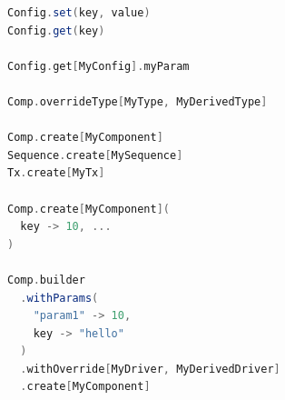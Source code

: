 \begin{listing}
\begin{lstlisting}[language=scala, captionpos=b, caption={Demonstration of the API for the four different factories for components, sequences, transactions and configuration objects.},label=lst:factory]
Config.set(key, value)
Config.get(key)

Config.get[MyConfig].myParam

Comp.overrideType[MyType, MyDerivedType]

Comp.create[MyComponent]
Sequence.create[MySequence]
Tx.create[MyTx]

Comp.create[MyComponent](
  key -> 10, ...
)

Comp.builder
  .withParams(
    "param1" -> 10,
    key -> "hello"
  )
  .withOverride[MyDriver, MyDerivedDriver]
  .create[MyComponent]

\end{lstlisting}
\end{listing}



